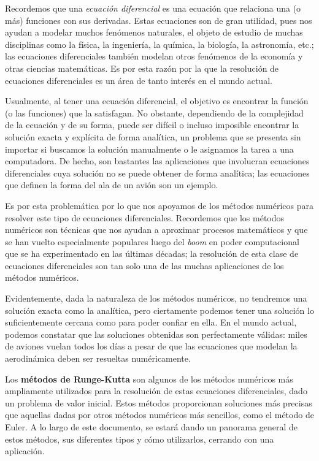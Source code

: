 \documentclass[12pt, a4paper]{article}
\begin{document}
\sffamily


\tableofcontents
\newpage

Recordemos que una \textit{ecuación diferencial} es una ecuación que relaciona una (o más) funciones con sus derivadas. Estas ecuaciones son de gran utilidad, pues nos ayudan a modelar muchos fenómenos naturales, el objeto de estudio de muchas disciplinas como la física, la ingeniería, la química, la biología, la astronomía, etc.; las ecuaciones diferenciales también modelan otros fenómenos de la economía y otras ciencias matemáticas. Es por esta razón por la que la resolución de ecuaciones diferenciales es un área de tanto interés en el mundo actual.

Usualmente, al tener una ecuación diferencial, el objetivo es encontrar la función (o las funciones) que la satisfagan. No obstante, dependiendo de la complejidad de la ecuación y de su forma, puede ser difícil o incluso imposible encontrar la solución exacta y explícita de forma analítica, un problema que se presenta sin importar si buscamos la solución manualmente o le asignamos la tarea a una computadora. De hecho, son bastantes las aplicaciones que involucran ecuaciones diferenciales cuya solución no se puede obtener de forma analítica; las ecuaciones que definen la forma del ala de un avión son un ejemplo.

Es por esta problemática por lo que nos apoyamos de los métodos numéricos para resolver este tipo de ecuaciones diferenciales. Recordemos que los métodos numéricos son técnicas que nos ayudan a aproximar procesos matemáticos y que se han vuelto especialmente populares luego del \textit{boom} en poder computacional que se ha experimentado en las últimas décadas; la resolución de esta clase de ecuaciones diferenciales son tan solo una de las muchas aplicaciones de los métodos numéricos.

Evidentemente, dada la naturaleza de los métodos numéricos, no tendremos una solución exacta como la analítica, pero ciertamente podemos tener una solución lo suficientemente cercana como para poder confiar en ella. En el mundo actual, podemos constatar que las soluciones obtenidas son perfectamente válidas: miles de aviones vuelan todos los días a pesar de que las ecuaciones que modelan la aerodinámica deben ser resueltas numéricamente.

Los \textbf{métodos de Runge-Kutta} son algunos de los métodos numéricos más ampliamente utilizados para la resolución de estas ecuaciones diferenciales, dado un problema de valor inicial. Estos métodos proporcionan soluciones más precisas que aquellas dadas por otros métodos numéricos más sencillos, como el método de Euler. A lo largo de este documento, se estará dando un panorama general de estos métodos, sus diferentes tipos y cómo utilizarlos, cerrando con una aplicación.
\end{document}

